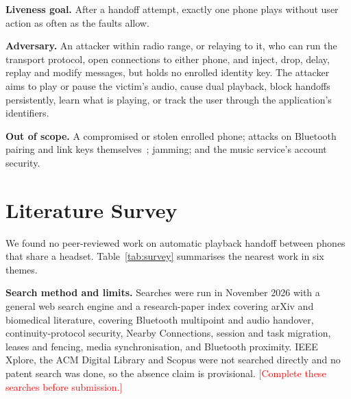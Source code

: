 \documentclass[conference]{IEEEtran}
\newcommand{\draftnote}[1]{\textcolor{red}{#1}}
\begin{document}
\textbf{Liveness goal.} After a handoff attempt, exactly one phone plays without user action as often as the faults allow.

\textbf{Adversary.} An attacker within radio range, or relaying to it, who can run the transport protocol, open connections to either phone, and inject, drop, delay, replay and modify messages, but holds no enrolled identity key. The attacker aims to play or pause the victim's audio, cause dual playback, block handoffs persistently, learn what is playing, or track the user through the application's identifiers.

\textbf{Out of scope.} A compromised or stolen enrolled phone; attacks on Bluetooth pairing and link keys themselves~\cite{bias2020,bluffs2023,blurtooth2020,happymitm2021,stealtooth2025}; jamming; and the music service's account security.

\section{Literature Survey}\label{sec:related}

We found no peer-reviewed work on automatic playback handoff between phones that share a headset. Table~\ref{tab:survey} summarises the nearest work in six themes.

\textbf{Search method and limits.} Searches were run in November 2026 with a general web search engine and a research-paper index covering arXiv and biomedical literature, covering Bluetooth multipoint and audio handover, continuity-protocol security, Nearby Connections, session and task migration, leases and fencing, media synchronisation, and Bluetooth proximity. IEEE Xplore, the ACM Digital Library and Scopus were not searched directly and no patent search was done, so the absence claim is provisional. \draftnote{[Complete these searches before submission.]}
\end{document}
